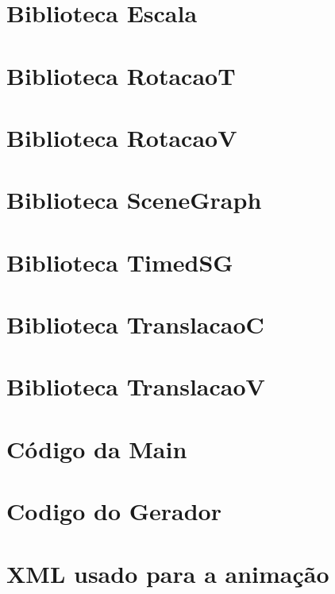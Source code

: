 \documentclass{article}
\begin{document}
\section{Biblioteca Escala}


\newpage

\section{Biblioteca RotacaoT}


\newpage

\section{Biblioteca RotacaoV}


\newpage

\section{Biblioteca SceneGraph}


\newpage

\section{Biblioteca TimedSG}


\newpage

\section{Biblioteca TranslacaoC}


\newpage

\section{Biblioteca TranslacaoV}


\newpage

\section{Código da Main}

\newpage

\section{Codigo do Gerador}

\newpage

\section{XML usado para a animação}

\end{document}
